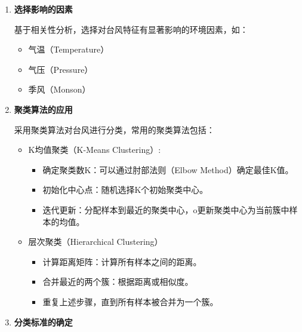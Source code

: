 \documentclass[withoutpreface,bwprint]{cumcmthesis}
\begin{document}
\begin{enumerate}
    \item[(1)] \textbf{选择影响的因素}

    基于相关性分析，选择对台风特征有显著影响的环境因素，如：

        \begin{itemize}
            \item 气温（Temperature）

            \item 气压（Pressure）

            \item 季风（Monson）
        \end{itemize}

    \item[(2)] \textbf{聚类算法的应用}

    采用聚类算法对台风进行分类，常用的聚类算法包括：

        \begin{itemize}
            \item K均值聚类（K-Means Clustering）:

            \begin{itemize}
                \item 确定聚类数K：可以通过肘部法则（Elbow Method）确定最佳K值。

                \item 初始化中心点：随机选择K个初始聚类中心。

                \item 迭代更新：分配样本到最近的聚类中心，o更新聚类中心为当前簇中样本的均值。
            \end{itemize}

            \item 层次聚类（Hierarchical Clustering）

            \begin{itemize}
                \item 计算距离矩阵：计算所有样本之间的距离。

                \item 合并最近的两个簇：根据距离或相似度。

                \item 重复上述步骤，直到所有样本被合并为一个簇。
            \end{itemize}
            
        \end{itemize}

    \item[(3)] \textbf{分类标准的确定}


\end{enumerate}
\end{document}
